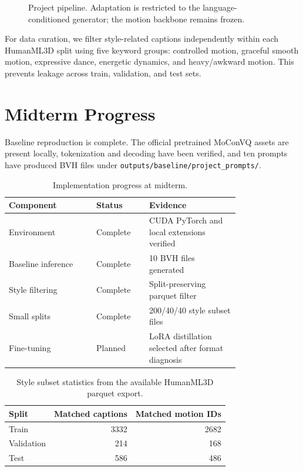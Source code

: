 \documentclass[conference]{IEEEtran}
\begin{document}
\begin{figure}[h]
\centering
{}
\caption{Project pipeline. Adaptation is restricted to the language-conditioned generator; the motion backbone remains frozen.}
\end{figure}

For data curation, we filter style-related captions independently within each HumanML3D split using five keyword groups: controlled motion, graceful smooth motion, expressive dance, energetic dynamics, and heavy/awkward motion. This prevents leakage across train, validation, and test sets.

\section{Midterm Progress}
Baseline reproduction is complete. The official pretrained MoConVQ assets are present locally, tokenization and decoding have been verified, and ten prompts have produced BVH files under \texttt{outputs/baseline/project\_prompts/}.

\begin{table}[h]
\centering
\caption{Implementation progress at midterm.}
\footnotesize
\begin{tabular}{p{0.30\linewidth}p{0.17\linewidth}p{0.31\linewidth}}
\hline
Component & Status & Evidence \\
\hline
Environment & Complete & CUDA PyTorch and local extensions verified \\
Baseline inference & Complete & 10 BVH files generated \\
Style filtering & Complete & Split-preserving parquet filter \\
Small splits & Complete & 200/40/40 style subset files \\
Fine-tuning & Planned & LoRA distillation selected after format diagnosis \\
\hline
\end{tabular}
\end{table}

\begin{table}[h]
\centering
\caption{Style subset statistics from the available HumanML3D parquet export.}
\footnotesize
\begin{tabular}{lrr}
\hline
Split & Matched captions & Matched motion IDs \\
\hline
Train & 3332 & 2682 \\
Validation & 214 & 168 \\
Test & 586 & 486 \\
\hline
\end{tabular}
\end{table}
\end{document}
